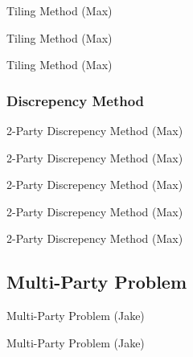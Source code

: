 \documentclass{beamer}
\begin{document}
\begin{frame}{Tiling Method (Max)}

\end{frame}

\begin{frame}{Tiling Method (Max)}

\end{frame}

\begin{frame}{Tiling Method (Max)}

\end{frame}

\subsubsection{Discrepency Method}

\begin{frame}{2-Party Discrepency Method (Max)}

\end{frame}

\begin{frame}{2-Party Discrepency Method (Max)}

\end{frame}

\begin{frame}{2-Party Discrepency Method (Max)}

\end{frame}

\begin{frame}{2-Party Discrepency Method (Max)}

\end{frame}

\begin{frame}{2-Party Discrepency Method (Max)}

\end{frame}

\subsection{Multi-Party Problem}

\begin{frame}{Multi-Party Problem (Jake)}

\end{frame}

\begin{frame}{Multi-Party Problem (Jake)}

\end{frame}
\end{document}
